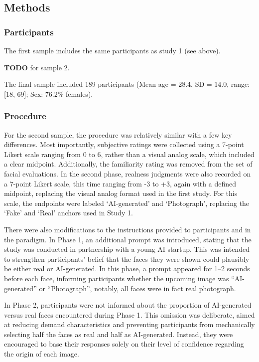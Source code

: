 \documentclass[
  jou,
  floatsintext,
  longtable,
  nolmodern,
  notxfonts,
  notimes,
  colorlinks=true,linkcolor=blue,citecolor=blue,urlcolor=blue]{apa7}
\begin{document}
\subsection{Methods}\label{methods-1}

\subsubsection{Participants}\label{participants-1}

The first sample includes the same participants as study 1 (see above).

\textbf{TODO} for sample 2.

The final sample included 189 participants (Mean age = 28.4, SD = 14.0,
range: {[}18, 69{]}; Sex: 76.2\% females).

\subsubsection{Procedure}\label{procedure-1}

For the second sample, the procedure was relatively similar with a few
key differences. Most importantly, subjective ratings were collected
using a 7-point Likert scale ranging from 0 to 6, rather than a visual
analog scale, which included a clear midpoint. Additionally, the
familiarity rating was removed from the set of facial evaluations. In
the second phase, realness judgments were also recorded on a 7-point
Likert scale, this time ranging from -3 to +3, again with a defined
midpoint, replacing the visual analog format used in the first study.
For this scale, the endpoints were labeled `AI-generated' and
`Photograph', replacing the `Fake' and `Real' anchors used in Study 1.

There were also modifications to the instructions provided to
participants and in the paradigm. In Phase 1, an additional prompt was
introduced, stating that the study was conducted in partnership with a
young AI startup. This was intended to strengthen participants' belief
that the faces they were shown could plausibly be either real or
AI-generated. In this phase, a prompt appeared for 1--2 seconds before
each face, informing participants whether the upcoming image was
``AI-generated'' or ``Photograph'', notably, all faces were in fact real
photograph.

In Phase 2, participants were not informed about the proportion of
AI-generated versus real faces encountered during Phase 1. This omission
was deliberate, aimed at reducing demand characteristics and preventing
participants from mechanically selecting half the faces as real and half
as AI-generated. Instead, they were encouraged to base their responses
solely on their level of confidence regarding the origin of each image.
\end{document}
